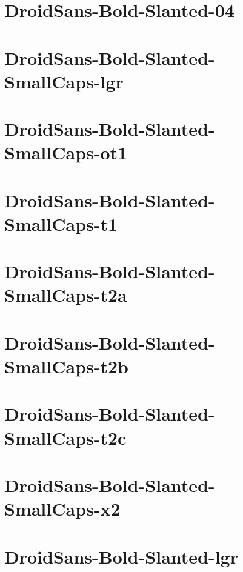\documentclass{article}
\begin{document}
\section{DroidSans-Bold-Slanted-04}

\section{DroidSans-Bold-Slanted-SmallCaps-lgr}

\section{DroidSans-Bold-Slanted-SmallCaps-ot1}

\section{DroidSans-Bold-Slanted-SmallCaps-t1}

\section{DroidSans-Bold-Slanted-SmallCaps-t2a}

\section{DroidSans-Bold-Slanted-SmallCaps-t2b}

\section{DroidSans-Bold-Slanted-SmallCaps-t2c}

\section{DroidSans-Bold-Slanted-SmallCaps-x2}

\section{DroidSans-Bold-Slanted-lgr}
\end{document}
